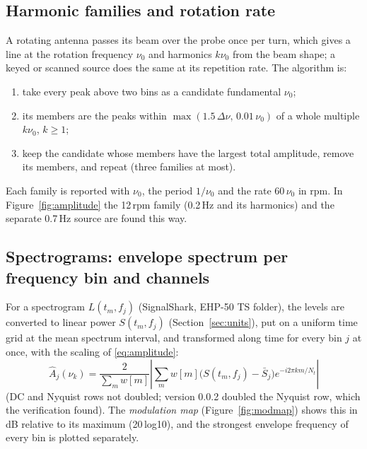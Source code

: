 \documentclass[10pt,letterpaper]{article}
\numberwithin{equation}{section}
\begin{document}
\subsection{Harmonic families and rotation rate}\label{sec:families}
A rotating antenna passes its beam over the probe once per turn, which gives a
line at the rotation frequency $\nu_0$ and harmonics $k\nu_0$ from the beam
shape; a keyed or scanned source does the same at its repetition rate. The
algorithm is:
\begin{enumerate}
\item take every peak above two bins as a candidate fundamental $\nu_0$;
\item its members are the peaks within $\max(1.5\,\Delta\nu,\,0.01\,\nu_0)$ of a
whole multiple $k\nu_0$, $k\ge1$;
\item keep the candidate whose members have the largest total amplitude,
remove its members, and repeat (three families at most).
\end{enumerate}
Each family is reported with $\nu_0$, the period $1/\nu_0$ and the rate
$60\,\nu_0$ in rpm. In Figure~\ref{fig:amplitude} the 12\,rpm family (0.2\,Hz and
its harmonics) and the separate 0.7\,Hz source are found this way.

\subsection{Spectrograms: envelope spectrum per frequency bin and channels}\label{sec:spectrogram}
For a spectrogram $L(t_m, f_j)$ (SignalShark, EHP-50 TS folder), the levels are
converted to linear power $S(t_m, f_j)$ (Section~\ref{sec:units}), put on a
uniform time grid at the mean spectrum interval, and transformed along time for
every bin $j$ at once, with the scaling of \eqref{eq:amplitude}:
\begin{equation}
\hat{A}_j(\nu_k) = \frac{2}{\sum_m w[m]}\left|\sum_m w[m]\big(S(t_m,f_j) - \bar{S}_j\big)e^{-i2\pi km/N_t}\right|
\end{equation}
(DC and Nyquist rows not doubled; version 0.0.2 doubled the Nyquist row, which
the verification found). The \emph{modulation map} (Figure~\ref{fig:modmap})
shows this in dB relative to its maximum (20\,log10), and the strongest
envelope frequency of every bin is plotted separately.
\end{document}
